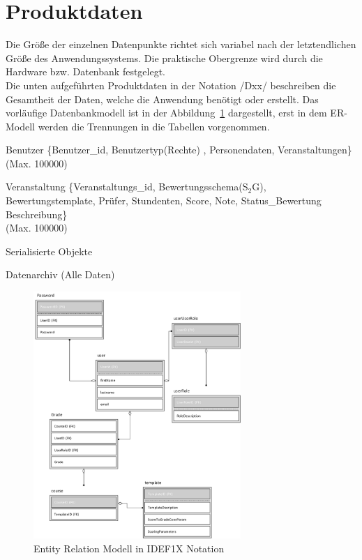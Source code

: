 	
	
	\section{Produktdaten}
	
		Die Größe der einzelnen Datenpunkte richtet sich variabel nach der letztendlichen Größe des Anwendungssystems. Die praktische Obergrenze wird durch die Hardware bzw. Datenbank festgelegt. 
		\\
		Die unten aufgeführten Produktdaten in der Notation /Dxx/ beschreiben die Gesamtheit der Daten, welche die Anwendung benötigt oder erstellt. Das vorläufige Datenbankmodell ist in der Abbildung~\ref{fig:ERM} dargestellt, erst in dem ER-Modell werden die Trennungen in die Tabellen vorgenommen.
		
	 
		
	\begin{description}
	\item[/D10/] Benutzer \{Benutzer\_id, Benutzertyp(Rechte) , Personendaten, Veranstaltungen\}\\ (Max. 100000) 
	\item[/D20/] Veranstaltung \{Veranstaltungs\_id, Bewertungsschema(S$_2$G), Bewertungstemplate, Prüfer, Stundenten, Score, Note, Status\_Bewertung\, Beschreibung\} \\ (Max. 100000)
	\item[/D30/] Serialisierte Objekte
	\item[/D40/] Datenarchiv (Alle Daten)
	\end{description}
	
	
	\begin{figure}[H]
\centering
\includegraphics[width=0.7\textwidth]{./img/ERM}
\caption{Entity Relation Modell in IDEF1X Notation}
\label{fig:ERM}
\end{figure}

